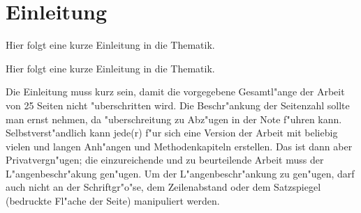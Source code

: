 \chapter{Einleitung}
\label{einleitung}

Hier folgt eine kurze Einleitung in die Thematik. 

Hier folgt eine kurze Einleitung in die Thematik.

Die Einleitung muss kurz sein, damit die vorgegebene Gesamtl"ange der
Arbeit von 25 Seiten nicht "uberschritten wird. Die Beschr"ankung der
Seitenzahl sollte man ernst nehmen, da "uberschreitung zu Abz"ugen in
der Note f"uhren kann. Selbstverst"andlich kann jede(r) f"ur sich eine
Version der Arbeit mit beliebig vielen und langen Anh"angen und
Methodenkapiteln erstellen. Das ist dann aber Privatvergn"ugen; die
einzureichende und zu beurteilende Arbeit muss der
L"angenbeschr"akung gen"ugen. Um der L"angenbeschr"ankung zu gen"ugen,
darf auch nicht an der Schriftgr"o"se, dem Zeilenabstand oder dem
Satzspiegel (bedruckte Fl"ache der Seite) manipuliert werden.

\FloatBarrier